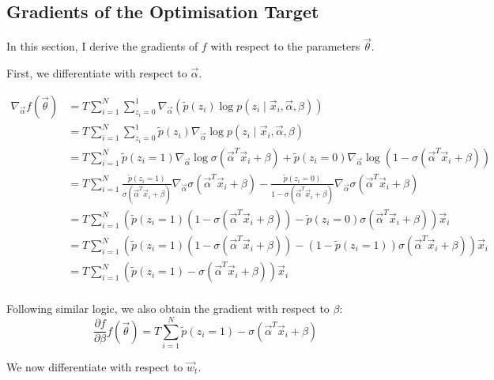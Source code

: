     \newpage
    \subsection{Gradients of the Optimisation Target}

        In this section, I derive the gradients of $f$ with respect to the parameters $\vec \theta$.

        First, we differentiate with respect to $\vec \alpha$.

        \begin{align*}
            \nabla_{\vec \alpha} f(\vec \theta) &= T \sum_{i = 1}^N \sum_{z_i = 0}^1 \nabla_{\vec \alpha} (\tilde p(z_i) \log p(z_i \mid \vec x_i, \vec \alpha, \beta))\\
                &= T \sum_{i = 1}^N \sum_{z_i = 0}^1 \tilde p(z_i) \nabla_{\vec \alpha} \log p(z_i \mid \vec x_i, \vec \alpha, \beta)\\
                &= T \sum_{i = 1}^N \tilde p(z_i = 1) \nabla_{\vec \alpha} \log \sigma(\vec \alpha^T \vec x_i + \beta) + \tilde p(z_i = 0) \nabla_{\vec \alpha} \log (1 - \sigma(\vec \alpha^T \vec x_i + \beta))\\
                &= T \sum_{i = 1}^N \frac{\tilde p(z_i = 1)}{\sigma(\vec \alpha^T \vec x_i + \beta)} \nabla_{\vec \alpha} \sigma(\vec \alpha^T \vec x_i + \beta) - \frac{\tilde p(z_i = 0)}{1 - \sigma(\vec \alpha^T \vec x_i + \beta)} \nabla_{\vec \alpha} \sigma(\vec \alpha^T \vec x_i + \beta)\\
                &= T \sum_{i = 1}^N \left(\tilde p(z_i = 1) (1 - \sigma(\vec \alpha^T \vec x_i + \beta)) - \tilde p(z_i = 0) \sigma(\vec \alpha^T \vec x_i + \beta)\right) \vec x_i\\
                &= T \sum_{i = 1}^N \left(\tilde p(z_i = 1) (1 - \sigma(\vec \alpha^T \vec x_i + \beta)) - (1 - \tilde p(z_i = 1)) \sigma(\vec \alpha^T \vec x_i + \beta)\right) \vec x_i\\
                &= T \sum_{i = 1}^N \left(\tilde p(z_i = 1) - \sigma(\vec \alpha^T \vec x_i + \beta)\right) \vec x_i\\
        \end{align*}

        Following similar logic, we also obtain the gradient with respect to $\beta$:
        \[
            \frac{\partial f}{\partial \beta} f(\vec \theta) = T \sum_{i = 1}^N \tilde p(z_i = 1) - \sigma(\vec \alpha^T \vec x_i + \beta)
        \]

        We now differentiate with respect to $\vec w_t$.

